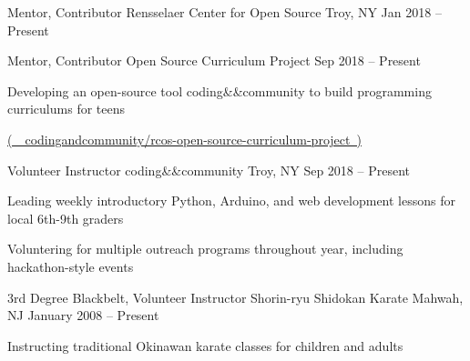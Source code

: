 


\begin{cventries}

  \cventry
  {Mentor, Contributor}
  {Rensselaer Center for Open Source}
  {Troy, NY}
  {Jan 2018 -- Present}
  {
    \vspace*{-1\abovedisplayskip}
    \begin{cvsubentries}
      \cvsubentry
      {Mentor, Contributor}
      {Open Source Curriculum Project}
      {Sep 2018 -- Present}
      {
        \begin{cvitems}
          \item Developing an open-source tool coding\&\&community to build programming curriculums for teens
          \item[] \href{https://github.com/codingandcommunity/rcos-open-source-curriculum-project}{(\ \faGithubSquare\ codingandcommunity/rcos-open-source-curriculum-project\ )}
        \end{cvitems}
      }
    \end{cvsubentries}
    \vspace*{-1\belowdisplayskip}
  }


  \cventry
  {Volunteer Instructor}
  {coding\&\&community}
  {Troy, NY}
  {Sep 2018 -- Present}
  {
    \begin{cvitems}
      \item Leading weekly introductory Python, Arduino, and web development lessons for local 6th-9th graders
      \item Voluntering for multiple outreach programs throughout year, including hackathon-style events
    \end{cvitems}
  }


  \cventry
  {3rd Degree Blackbelt, Volunteer Instructor}
  {Shorin-ryu Shidokan Karate}
  {Mahwah, NJ}
  {January 2008 -- Present}
  {
    \begin{cvitems}
      \item Instructing traditional Okinawan karate classes for children and adults
    \end{cvitems}
  }


\end{cventries}